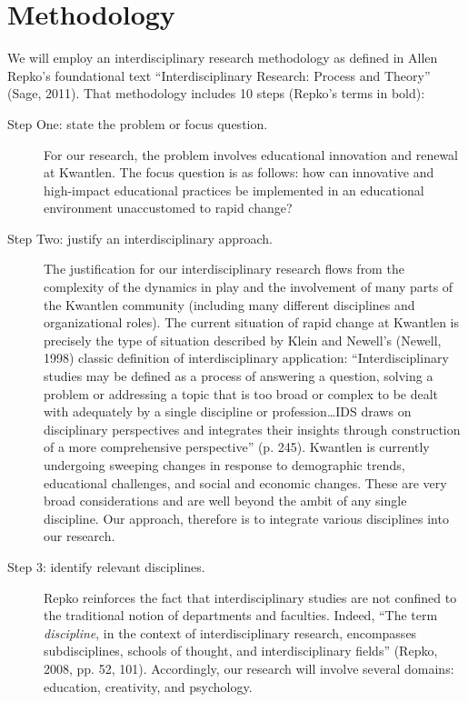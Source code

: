 \documentclass[letterpaper,10pt,headsepline]{scrreprt}
\begin{document}
\section{Methodology}

We will employ an interdisciplinary research methodology as defined in Allen
Repko's foundational text ``Interdisciplinary Research: Process and Theory''
(Sage, 2011). That methodology includes 10 steps (Repko's terms in bold):

\begin{description}
\item[Step One: state the problem or focus question.] For our research, the problem
  involves educational innovation and renewal at Kwantlen. The focus question
  is as follows: how can innovative and high-impact educational practices be
  implemented in an educational environment unaccustomed to rapid change?

\item[Step Two: justify an interdisciplinary approach.] The
  justification for our interdisciplinary research flows from the complexity
  of the dynamics in play and the involvement of many parts of the Kwantlen
  community (including many different disciplines and organizational roles).
  The current situation of rapid change at Kwantlen is precisely the type of
  situation described by Klein and Newell's (Newell, 1998) classic definition
  of interdisciplinary application: ``Interdisciplinary studies may be defined
  as a process of answering a question, solving a problem or addressing a
  topic that is too broad or complex to be dealt with adequately by a single
  discipline or profession\ldots IDS draws on disciplinary perspectives and
  integrates their insights through construction of a more comprehensive
  perspective'' (p. 245). Kwantlen is currently undergoing sweeping changes in
  response to demographic trends, educational challenges, and social and
  economic changes. These are very broad considerations and are well beyond
  the ambit of any single discipline. Our approach, therefore is to integrate
  various disciplines into our research.

\item[Step 3: identify relevant disciplines.] Repko reinforces the fact that
  interdisciplinary studies are not confined to the traditional notion of
  departments and faculties. Indeed, ``The term \emph{discipline}, in the
  context of interdisciplinary research, encompasses subdisciplines, schools
  of thought, and interdisciplinary fields'' (Repko, 2008, pp. 52, 101).
  Accordingly, our research will involve several domains: education,
  creativity, and psychology.


\end{description}
\end{document}
